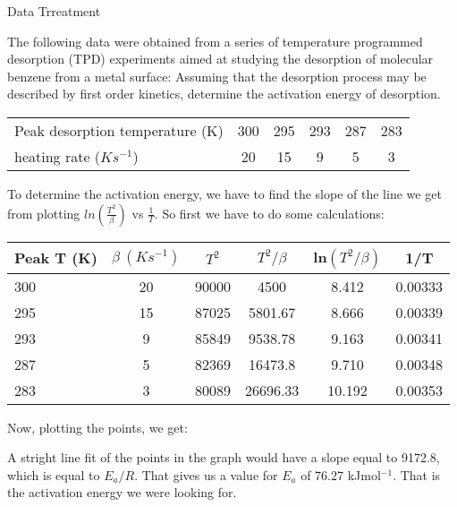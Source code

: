 \documentclass[ignorenonframetext]{beamer}
\begin{document}
\begin{example}{Data Trreatment}

The following data were obtained from a series of temperature programmed desorption (TPD) experiments aimed at studying the desorption of molecular benzene from a metal surface:
Assuming that the desorption process may be described by first order kinetics, determine the activation energy of desorption.

\begin{tabular}{lccccc}
Peak desorption temperature (K) & 300 & 295 & 293 & 287 & 283\\
heating rate (\(Ks^{-1}\)) & 20 & 15 & 9 & 5 & 3
\end{tabular}

To determine the activation energy, we have to find the slope of the line we get from plotting \(ln\left(\frac{T^2}{\beta}\right)\) vs \(\frac{1}{T}\). So first we have to do some calculations:

\begin{tabular}{lccccc}
Peak T (K) & \(\beta\ (Ks^{-1})\) & \(T^2\) & \(T^2/\beta\) & ln\((T^2/\beta)\) & 1/T\\\hline
300 & 20 & 90000 & 4500 & 8.412 & 0.00333\\
295 & 15 & 87025 & 5801.67 & 8.666 & 0.00339\\
293 & 9 & 85849 & 9538.78 & 9.163 & 0.00341\\
287 & 5 & 82369 & 16473.8 & 9.710 & 0.00348\\
283 & 3 & 80089 & 26696.33 & 10.192 & 0.00353\\\hline
\end{tabular}

Now, plotting the points, we get:


A stright line fit of the points in the graph would have a slope equal to 9172.8, which is equal to \(E_a/R\). That gives us a value for \(E_a\) of 76.27 kJmol\(^{-1}\). That is the activation energy we were looking for.

\end{example}
\end{document}

